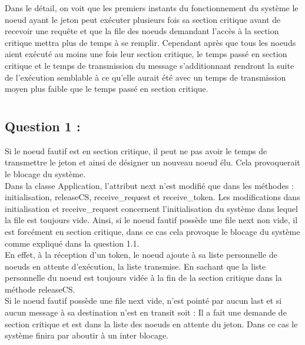 \documentclass[11pt,a4paper]{report}
\begin{document}
Dans le détail, on voit que les premiers instants du fonctionnement du système le noeud ayant le jeton peut exécuter plusieurs fois sa section critique avant de recevoir une requête et que la file des noeuds demandant l'accès à la section critique mettra plus de temps à se remplir. Cependant après que tous les noeuds aient exécuté au moins une fois leur section critique, le temps passé en section critique et le temps de transmission du message s'additionnant rendront la suite de l'exécution semblable à ce qu'elle aurait été avec un temps de transmission moyen plus faible que le temps passé en section critique.\\


\chapter{}

\section{Question 1 :}

 Si le noeud fautif est en section critique, il peut ne pas avoir le temps de transmettre le jeton et ainsi de désigner un nouveau noeud élu. Cela provoquerait le blocage du système.\\

 Dans la classe Application, l'attribut next n'est modifié que dans les méthodes : initialisation, releaseCS, receive\_request et receive\_token. Les modifications dans initialisation et receive\_request concernent l'initialisation du système dans lequel la file est toujours vide. Ainsi, si le noeud fautif possède une file next non vide, il est forcément en section critique, dans ce cas cela provoque le blocage du système comme expliqué dans la question 1.1.\\

En effet, à la réception d'un token, le noeud ajoute à sa liste personnelle de noeuds en attente d'exécution, la liste transmise. En sachant que la liste personnelle du noeud est toujours vidée à la fin de la section critique dans la méthode releaseCS.\\

Si le noeud fautif possède une file next vide, n'est pointé par aucun last et si aucun message à sa destination n'est en transit soit :
 Il a fait une demande de section critique et est dans la liste des noeuds en attente du jeton. Dans ce cas le système finira par aboutir à un inter blocage.\\
\end{document}
